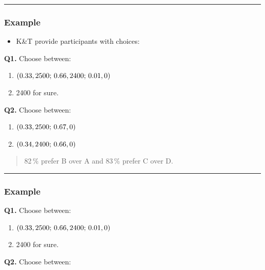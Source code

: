 \documentclass[
  letterpaper,
  DIV=11,
  numbers=noendperiod]{scrartcl}
\providecommand{\tightlist}{%
  \setlength{\itemsep}{0pt}\setlength{\parskip}{0pt}}\usepackage{longtable,booktabs,array}
\begin{document}
\begin{center}\rule{0.5\linewidth}{0.5pt}\end{center}

\subsubsection{Example~}\label{example}

\begin{itemize}
\tightlist
\item
  K\&T provide participants with choices:
\end{itemize}

\textbf{Q1.} Choose between:

\begin{enumerate}
\def\labelenumi{(\Alph{enumi})}
\tightlist
\item
  \(\tiny(0.33, 2500;\,0.66, 2400;\,0.01,0)\)
\item
  2400 for sure.
\end{enumerate}

\textbf{Q2.} Choose between: ~

\begin{enumerate}
\def\labelenumi{(\Alph{enumi})}
\setcounter{enumi}{2}
\tightlist
\item
  \(\tiny(0.33,2500;\,0.67,0)\)
\item
  \(\tiny(0.34,2400;\,0.66,0)\)
\end{enumerate}

\begin{quote}
82\,\% prefer B over A and 83\,\% prefer C over D.
\end{quote}

\begin{center}\rule{0.5\linewidth}{0.5pt}\end{center}

\subsubsection{Example}\label{example-1}

\textbf{Q1.} Choose between:

\begin{enumerate}
\def\labelenumi{(\Alph{enumi})}
\tightlist
\item
  \(\tiny(0.33, 2500;\,0.66, 2400;\,0.01,0)\)
\item
  2400 for sure.
\end{enumerate}

\textbf{Q2.} Choose between: ~
\end{document}

